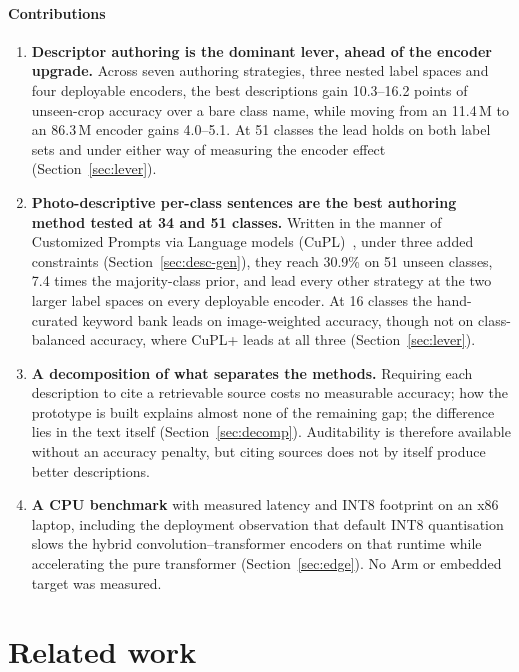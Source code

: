 \documentclass[a4paper,fleqn]{cas-dc}
\begin{document}
\paragraph{Contributions}
\begin{enumerate}
\item \textbf{Descriptor authoring is the dominant lever, ahead of the encoder upgrade.} Across
seven authoring strategies, three nested label spaces and four deployable encoders, the best
descriptions gain 10.3--16.2 points of unseen-crop accuracy over a bare class name, while moving
from an 11.4\,M to an 86.3\,M encoder gains 4.0--5.1. At 51 classes the lead holds on both label
sets and under either way of measuring the encoder effect (Section~\ref{sec:lever}).
\item \textbf{Photo-descriptive per-class sentences are the best authoring method tested at 34 and
51 classes.} Written in the manner of Customized Prompts via Language models
(CuPL)~\citep{pratt2023}, under three added constraints (Section~\ref{sec:desc-gen}), they reach
30.9\% on 51 unseen classes, 7.4 times the majority-class prior, and lead every other strategy at
the two larger label spaces on every deployable encoder. At 16 classes the hand-curated keyword bank leads on image-weighted accuracy, though not on
class-balanced accuracy, where CuPL+ leads at all three (Section~\ref{sec:lever}).
\item \textbf{A decomposition of what separates the methods.} Requiring each description to cite a
retrievable source costs no measurable accuracy; how the prototype is built explains almost none of
the remaining gap; the difference lies in the text itself (Section~\ref{sec:decomp}). Auditability
is therefore available without an accuracy penalty, but citing sources does not by itself produce
better descriptions.
\item \textbf{A CPU benchmark} with measured latency and INT8 footprint on an x86 laptop, including
the deployment observation that default INT8 quantisation slows the hybrid
convolution--transformer encoders on that runtime while accelerating the pure transformer
(Section~\ref{sec:edge}). No Arm or embedded target was measured.
\end{enumerate}

\section{Related work}
\label{sec:related}
\end{document}
